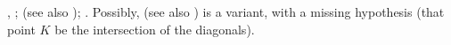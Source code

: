 \cite[problem~24]{khovanova1975notes},
\cite[problem~59]{khovanova1975notebook};
\cite{shen1994entrance} (see also \cite[problem~1]{vardi2000mekh});
\cite[page~2]{tabachnikov2020revieweinstein}.
Possibly, \cite[problem~28]{khovanova1975notebook}
(see also \cite[problem~28]{khovanova2005coffinsmain})
is a variant, with a missing hypothesis
(that point $K$ be the intersection of the diagonals).
